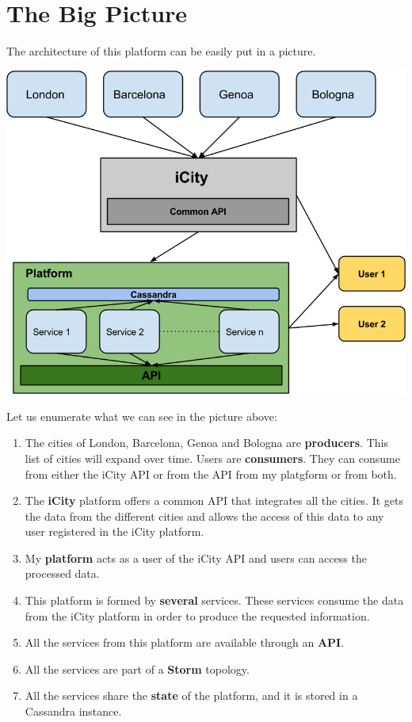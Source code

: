  
\section{The Big Picture}

The architecture of this platform can be easily put in a picture.

\begin{center}
  \includegraphics[scale=0.8]{overview/images/big.png}
\end{center}

Let us enumerate what we can see in the picture above:

\begin{enumerate}
  \item The cities of London, Barcelona, Genoa and Bologna are {\bf producers}.
This list of cities will expand over time. Users are {\bf consumers}. They can
consume from either the iCity API or from the API from my platgform or from
both.
  \item The {\bf iCity} platform offers a common API that integrates all the
cities. It gets the data from the different cities and allows the access of
this data to any user registered in the iCity platform.
  \item My {\bf platform} acts as a user of the iCity API and users can access
the processed data.
  \item This platform is formed by {\bf several} services. These services
consume the data from the iCity platform in order to produce the requested
information.
  \item All the services from this platform are available through an {\bf API}.
  \item All the services are part of a {\bf Storm} topology.
  \item All the services share the {\bf state} of the platform, and it is stored
in a Cassandra instance.
\end{enumerate}

